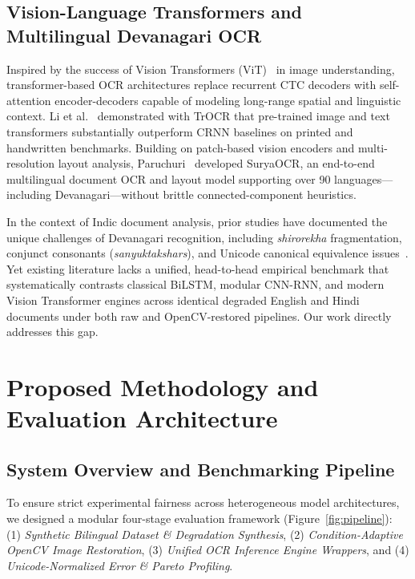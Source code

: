 \documentclass[11pt,a4paper]{article}
\begin{document}
\subsection{Vision-Language Transformers and Multilingual Devanagari OCR}
Inspired by the success of Vision Transformers (ViT)~\cite{dosovitskiy2020image} in image understanding, transformer-based OCR architectures replace recurrent CTC decoders with self-attention encoder-decoders capable of modeling long-range spatial and linguistic context. Li et al.~\cite{li2023trocr} demonstrated with TrOCR that pre-trained image and text transformers substantially outperform CRNN baselines on printed and handwritten benchmarks. Building on patch-based vision encoders and multi-resolution layout analysis, Paruchuri~\cite{paruchuri2024surya} developed SuryaOCR, an end-to-end multilingual document OCR and layout model supporting over 90 languages—including Devanagari—without brittle connected-component heuristics.

In the context of Indic document analysis, prior studies have documented the unique challenges of Devanagari recognition, including \textit{shirorekha} fragmentation, conjunct consonants (\textit{sanyuktakshars}), and Unicode canonical equivalence issues~\cite{pal2004indian,jawahar2003bilingual,dwivedi2020indic}. Yet existing literature lacks a unified, head-to-head empirical benchmark that systematically contrasts classical BiLSTM, modular CNN-RNN, and modern Vision Transformer engines across identical degraded English and Hindi documents under both raw and OpenCV-restored pipelines. Our work directly addresses this gap.

\newpage
\section{Proposed Methodology and Evaluation Architecture}

\subsection{System Overview and Benchmarking Pipeline}
To ensure strict experimental fairness across heterogeneous model architectures, we designed a modular four-stage evaluation framework (Figure~\ref{fig:pipeline}): (1) \textit{Synthetic Bilingual Dataset & Degradation Synthesis}, (2) \textit{Condition-Adaptive OpenCV Image Restoration}, (3) \textit{Unified OCR Inference Engine Wrappers}, and (4) \textit{Unicode-Normalized Error & Pareto Profiling}.
\end{document}
